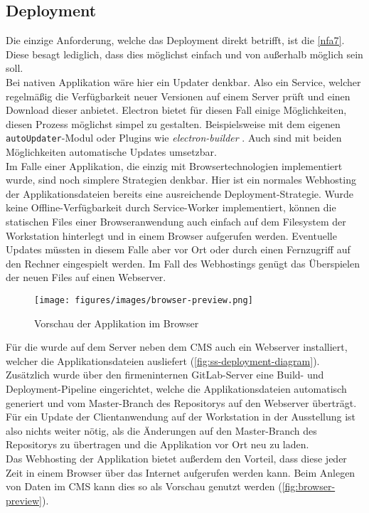 \subsection{Deployment}
\label{subs:deployment}

Die einzige Anforderung, welche das Deployment direkt betrifft, ist die 
\ref{nfa7}. Diese besagt lediglich, dass dies möglichst einfach und von außerhalb möglich
sein soll.\\
Bei nativen Applikation wäre hier ein Updater denkbar. Also ein Service,
welcher regelmäßig die Verfügbarkeit neuer Versionen auf einem Server prüft und einen Download 
dieser anbietet. Electron bietet für diesen Fall einige Möglichkeiten, diesen Prozess 
möglichst simpel zu gestalten. Beispielsweise mit dem eigenen 
\texttt{autoUpdater}-Modul \cite{electron-autoUpdater} oder Plugins wie 
\emph{electron-builder} \cite{electron-builder}. Auch sind mit beiden Möglichkeiten
automatische Updates umsetzbar.\\
Im Falle einer Applikation, die einzig mit Browsertechnologien implementiert wurde, sind 
noch simplere Strategien denkbar. Hier ist ein normales Webhosting der Applikationsdateien 
bereits eine ausreichende Deployment-Strategie. Wurde keine Offline-Verfügbarkeit durch
Service-Worker implementiert, können die statischen Files einer Browseranwendung
auch einfach auf dem Filesystem der Workstation hinterlegt und in einem Browser aufgerufen 
werden. Eventuelle Updates müssten in diesem Falle aber vor Ort oder durch einen
Fernzugriff auf den Rechner eingespielt werden. Im Fall des Webhostings genügt das Überspielen
der neuen Files auf einen Webserver.\\

\begin{figure}
    \centering
    \texttt{[image: figures/images/browser-preview.png]}
    \caption{Vorschau der \shst{} Applikation im Browser}
    \label{fig:browser-preview}
\end{figure}

Für die \shst{} wurde auf dem Server neben dem CMS auch ein Webserver installiert, welcher die 
Applikationsdateien ausliefert (\autoref{fig:ss-deployment-diagram}). Zusätzlich wurde über den 
firmeninternen GitLab-Server \cite{gitlab} eine Build- und Deployment-Pipeline eingerichtet, welche die 
Applikationsdateien automatisch generiert und vom Master-Branch des Repositorys auf den Webserver überträgt. 
Für ein Update der Clientanwendung auf der Workstation in der Ausstellung ist also nichts weiter 
nötig, als die Änderungen auf den Master-Branch des Repositorys zu übertragen und die Applikation vor
Ort neu zu laden.\\
Das Webhosting der Applikation bietet außerdem den Vorteil, dass diese jeder Zeit in einem Browser 
über das Internet aufgerufen werden kann. Beim Anlegen von Daten im CMS kann dies so als
Vorschau genutzt werden (\autoref{fig:browser-preview}). 
